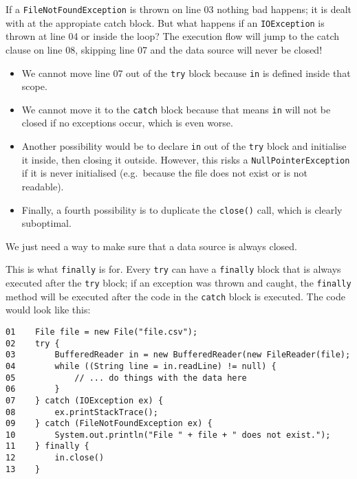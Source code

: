 If a \verb+FileNotFoundException+ is thrown on line 03 nothing bad
happens; it is dealt with at the appropiate catch block. But what
happens if an \verb+IOException+ is thrown at line 04 or inside the
loop? The execution flow will jump to the catch clause on line 08,
skipping line 07 and the data source will never be closed! 

\begin{itemize}
\item We cannot move line 07 out of the \verb+try+ block because
  \verb+in+ is defined inside that scope.
\item We cannot move it to the \verb+catch+ block because that means
  \verb+in+ will not be closed if no exceptions occur, which is even
  worse. 
\item Another possibility would be to declare \verb+in+ out of the
  \verb+try+ block and initialise it inside, then closing it
  outside. However, this risks a \verb+NullPointerException+ if it is
  never initialised (e.g.~because the file does not exist or is not
  readable). 
\item Finally, a fourth possibility is to duplicate the \verb+close()+
  call, which is clearly suboptimal.
\end{itemize}

We just need a way to make sure that a data source is always closed. 

This is what \verb+finally+ is for. Every \verb+try+ can have a
\verb+finally+ block that is always executed after the \verb+try+
block; if an exception was thrown and caught, the \verb+finally+
method will be executed after the code in the \verb+catch+ block is
executed. The code would look like this: 

\begin{verbatim}
01    File file = new File("file.csv");
02    try {
03        BufferedReader in = new BufferedReader(new FileReader(file); 
04        while ((String line = in.readLine) != null) {
05            // ... do things with the data here
06        }
07    } catch (IOException ex) {
08        ex.printStackTrace();
09    } catch (FileNotFoundException ex) {
10        System.out.println("File " + file + " does not exist.");
11    } finally { 
12        in.close()
13    }
\end{verbatim}







%
% 
%

